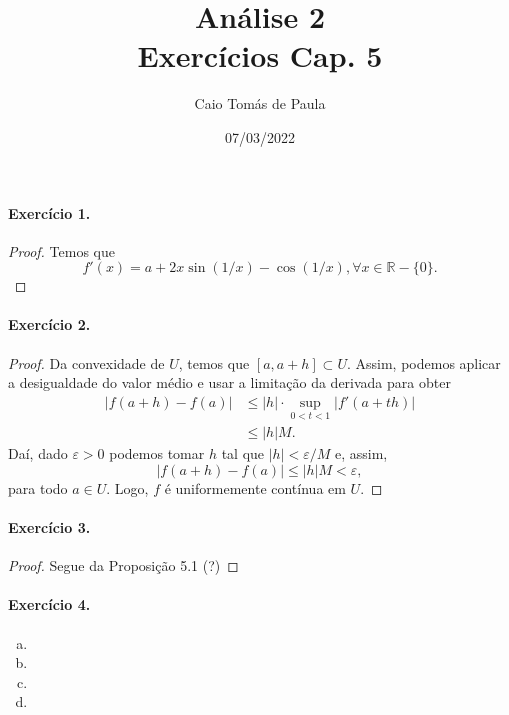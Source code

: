 \documentclass[12pt,a4paper]{article}
\title{\textbf{Análise 2}\\ Exercícios Cap. 5}
\author{Caio Tomás de Paula}
\date{07/03/2022}
\newcommand{\R}{\mathbb{R}}
\begin{document}
\maketitle

\paragraph{Exercício 1.}
    \begin{proof}
        Temos que
        \begin{equation*}
            f'(x) = a + 2x\sin(1/x) - \cos(1/x), \forall x\in\R - \{0\}.
        \end{equation*}
    \end{proof}
\paragraph{Exercício 2.}
    \begin{proof}
        Da convexidade de $U$, temos que $[a, a+h]\subset U$. Assim,
        podemos aplicar a desigualdade do valor médio e usar a limitação
        da derivada para obter
        \begin{align*}
            |f(a+h) - f(a)| &\leq |h|\cdot\sup_{0<t<1} |f'(a+th)| \\
                            &\leq |h|M.
        \end{align*}
        Daí, dado $\varepsilon >0$ podemos tomar $h$ tal que $|h| < \varepsilon/M$
        e, assim,
        \begin{equation*}
            |f(a+h) - f(a)| \leq |h|M < \varepsilon,
        \end{equation*}
        para todo $a\in U$. Logo, $f$ é uniformemente contínua em $U$.
    \end{proof}
\paragraph{Exercício 3.}
    \begin{proof}
        Segue da Proposição 5.1 (?)
    \end{proof}
\paragraph{Exercício 4.}
    \begin{enumerate}[a)]
        \item 
        
        \item
        
        \item
        
        \item
    \end{enumerate}
\end{document}
